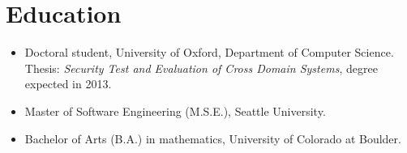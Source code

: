 \documentclass[12pt,letterpaper]{article}
\begin{document}
\vspace{-8mm}
\section*{Education}

\begin{itemize}
    \item Doctoral student, University of Oxford, Department of Computer Science.
		Thesis: \emph{Security Test
		and Evaluation of Cross Domain Systems}, degree expected in 2013.

    \item Master of Software Engineering (M.S.E.), Seattle University. %

    \item Bachelor of Arts (B.A.) in mathematics, University of Colorado at Boulder.


\end{itemize}
\end{document}
